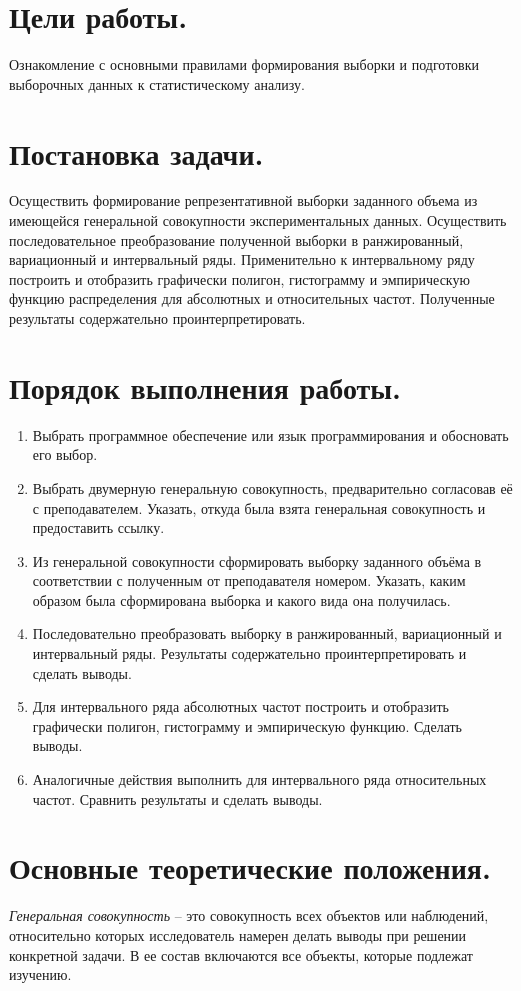 \setcounter{page}{2}
\section*{Цели работы.}
Ознакомление с основными правилами формирования выборки и подготовки выборочных данных к статистическому анализу.

\section*{Постановка задачи.}
Осуществить формирование репрезентативной выборки заданного объема из имеющейся генеральной
совокупности экспериментальных данных. 
Осуществить последовательное преобразование полученной выборки в ранжированный, 
вариационный и интервальный ряды. 
Применительно к интервальному ряду построить и отобразить графически полигон, 
гистограмму и эмпирическую функцию распределения для абсолютных и относительных частот. 
Полученные результаты содержательно проинтерпретировать.

\section*{Порядок выполнения работы.}
\begin{enumerate}
    \item Выбрать программное обеспечение или язык программирования и обосновать его выбор.
    \item Выбрать двумерную генеральную совокупность, предварительно согласовав её с преподавателем. Указать, откуда была взята генеральная совокупность и предоставить ссылку.
    \item Из генеральной совокупности сформировать выборку заданного объёма в соответствии с полученным от преподавателя номером. Указать, каким образом была сформирована выборка и какого вида она получилась.
    \item Последовательно преобразовать выборку в ранжированный, вариационный и интервальный ряды. Результаты содержательно проинтерпретировать и сделать выводы.
    \item Для интервального ряда абсолютных частот построить и отобразить графически полигон, гистограмму и эмпирическую функцию. Сделать выводы.
    \item Аналогичные действия выполнить для интервального ряда относительных частот. Сравнить результаты и сделать выводы.
\end{enumerate}

\section*{Основные теоретические положения.}
\textit{Генеральная совокупность} -- это совокупность всех объектов или наблюдений, относительно которых исследователь намерен делать выводы при решении конкретной задачи. В ее состав включаются все объекты, которые подлежат изучению.

